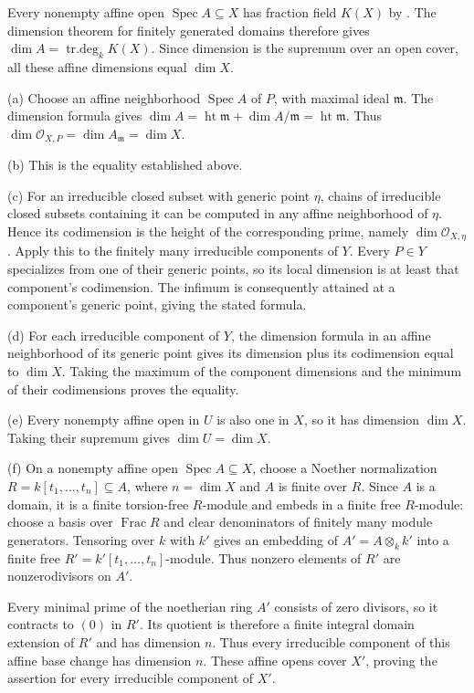 Every nonempty affine open $\operatorname{Spec}A\subseteq X$ has fraction field $K(X)$ by . The dimension theorem for finitely generated domains therefore gives $\dim A=\operatorname{tr.deg}_kK(X)$. Since dimension is the supremum over an open cover, all these affine dimensions equal $\dim X$.

(a) Choose an affine neighborhood $\operatorname{Spec}A$ of $P$, with maximal ideal $\mathfrak m$. The dimension formula gives $\dim A=\operatorname{ht}\mathfrak m+\dim A/\mathfrak m=\operatorname{ht}\mathfrak m$. Thus $\dim\mathcal O_{X,P}=\dim A_{\mathfrak m}=\dim X$.

(b) This is the equality established above.

(c) For an irreducible closed subset with generic point $\eta$, chains of irreducible closed subsets containing it can be computed in any affine neighborhood of $\eta$. Hence its codimension is the height of the corresponding prime, namely $\dim\mathcal O_{X,\eta}$. Apply this to the finitely many irreducible components of $Y$. Every $P\in Y$ specializes from one of their generic points, so its local dimension is at least that component's codimension. The infimum is consequently attained at a component's generic point, giving the stated formula.

(d) For each irreducible component of $Y$, the dimension formula in an affine neighborhood of its generic point gives its dimension plus its codimension equal to $\dim X$. Taking the maximum of the component dimensions and the minimum of their codimensions proves the equality.

(e) Every nonempty affine open in $U$ is also one in $X$, so it has dimension $\dim X$. Taking their supremum gives $\dim U=\dim X$.

(f) On a nonempty affine open $\operatorname{Spec}A\subseteq X$, choose a Noether normalization $R=k[t_1,\ldots,t_n]\subseteq A$, where $n=\dim X$ and $A$ is finite over $R$. Since $A$ is a domain, it is a finite torsion-free $R$-module and embeds in a finite free $R$-module: choose a basis over $\operatorname{Frac}R$ and clear denominators of finitely many module generators. Tensoring over $k$ with $k'$ gives an embedding of $A'=A\otimes_kk'$ into a finite free $R'=k'[t_1,\ldots,t_n]$-module. Thus nonzero elements of $R'$ are nonzerodivisors on $A'$.

Every minimal prime of the noetherian ring $A'$ consists of zero divisors, so it contracts to $(0)$ in $R'$. Its quotient is therefore a finite integral domain extension of $R'$ and has dimension $n$. Thus every irreducible component of this affine base change has dimension $n$. These affine opens cover $X'$, proving the assertion for every irreducible component of $X'$.
